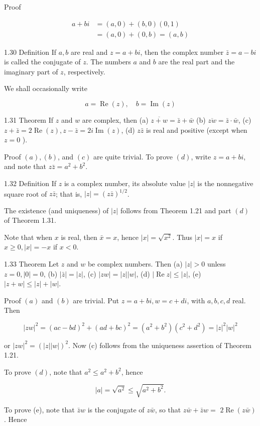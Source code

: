 \documentclass[10pt]{article}
\begin{document}
Proof

$$
\begin{aligned}
a+b i & =(a, 0)+(b, 0)(0,1) \\
& =(a, 0)+(0, b)=(a, b)
\end{aligned}
$$

1.30 Definition If $a, b$ are real and $z=a+b i$, then the complex number $\bar{z}=a-b i$ is called the conjugate of $z$. The numbers $a$ and $b$ are the real part and the imaginary part of $z$, respectively.

We shall occasionally write

$$
a=\operatorname{Re}(z), \quad b=\operatorname{Im}(z)
$$

1.31 Theorem If $z$ and $w$ are complex, then
(a) $\overline{z+w}=\bar{z}+\bar{w}$
(b) $\overline{z w}=\bar{z} \cdot \bar{w}$,
(c) $z+\bar{z}=2 \operatorname{Re}(z), z-\bar{z}=2 i \operatorname{Im}(z)$,
(d) $z \bar{z}$ is real and positive (except when $z=0$ ).

Proof $(a),(b)$, and $(c)$ are quite trivial. To prove $(d)$, write $z=a+b i$, and note that $z \bar{z}=a^{2}+b^{2}$.

1.32 Definition If $z$ is a complex number, its absolute value $|z|$ is the nonnegative square root of $z \bar{z}$; that is, $|z|=(z \bar{z})^{1 / 2}$.

The existence (and uniqueness) of $|z|$ follows from Theorem 1.21 and part $(d)$ of Theorem 1.31.

Note that when $x$ is real, then $\bar{x}=x$, hence $|x|=\sqrt{x^{2}}$. Thus $|x|=x$ if $x \geq 0,|x|=-x$ if $x<0$.

1.33 Theorem Let $z$ and $w$ be complex numbers. Then
(a) $|z|>0$ unless $z=0,|0|=0$,
(b) $|\bar{z}|=|z|$,
(c) $|z w|=|z||w|$,
(d) $|\operatorname{Re} z| \leq|z|$,
(e) $|z+w| \leq|z|+|w|$.

Proof $(a)$ and $(b)$ are trivial. Put $z=a+b i, w=c+d i$, with $a, b, c, d$ real. Then

$$
|z w|^{2}=(a c-b d)^{2}+(a d+b c)^{2}=\left(a^{2}+b^{2}\right)\left(c^{2}+d^{2}\right)=|z|^{2}|w|^{2}
$$

or $|z w|^{2}=(|z||w|)^{2}$. Now (c) follows from the uniqueness assertion of Theorem 1.21.

To prove $(d)$, note that $a^{2} \leq a^{2}+b^{2}$, hence

$$
|a|=\sqrt{a^{2}} \leq \sqrt{a^{2}+b^{2}} .
$$

To prove (e), note that $\bar{z} w$ is the conjugate of $z \bar{w}$, so that $z \bar{w}+\bar{z} w=$ $2 \operatorname{Re}(z \bar{w})$. Hence
\end{document}
